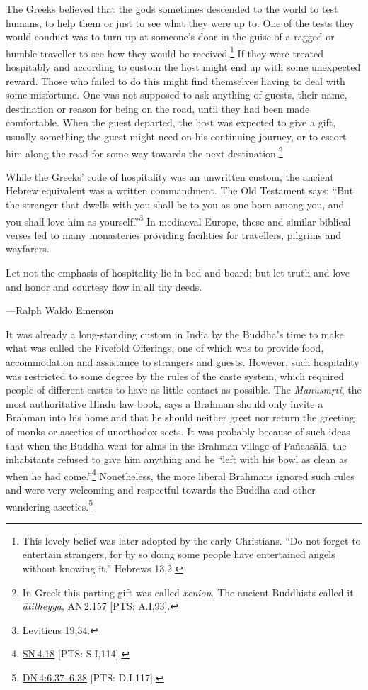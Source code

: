 \documentclass[10pt, openright]{book}
\newenvironment{epigram-2}%
{%
\vspace{1em}
\noindent
\quoting[leftmargin=2.5cm,rightmargin=2.5cm]%
\begin{itshape}
\large
}%
{\end{itshape}\endquoting
}%
\newenvironment{epigram-2-cite}%
{%
\quoting[leftmargin=2.5cm,rightmargin=2.5cm]%
\noindent\normal\hspace*{\fill} 
}%
{\endquoting\vspace{1em}
}%
\begin{document}
The Greeks believed that the gods sometimes descended to the world to test humans, to help them or just to see what they were up to. One of the tests they would conduct was to turn up at someone’s door in the guise of a ragged or humble traveller to see how they would be received.\footnote {This lovely belief was later adopted by the early Christians. “Do not forget to entertain strangers, for by so doing some people have entertained angels without knowing it.” Hebrews 13,2.} If they were treated hospitably and according to custom the host might end up with some unexpected reward. Those who failed to do this might find themselves having to deal with some misfortune. One was not supposed to ask anything of guests, their name, destination or reason for being on the road, until they had been made comfortable. When the guest departed, the host was expected to give a gift, usually something the guest might need on his continuing journey, or to escort him along the road for some way towards the next destination.\footnote {In Greek this parting gift was called \textit{xenion}. The ancient Buddhists called it \textit{ātitheyya}, \href{https://suttacentral.net/an2.157/en/sujato}{AN 2.157} [PTS: A.I,93].}


While the Greeks’ code of hospitality was an unwritten custom, the ancient Hebrew equivalent was a written commandment. The Old Testament says: “But the stranger that dwells with you shall be to you as one born among you, and you shall love him as yourself.”\footnote {Leviticus 19,34.} In mediaeval Europe, these and similar biblical verses led to many monasteries providing facilities for travellers, pilgrims and wayfarers.


\begin{epigram-2}
Let not the emphasis of hospitality lie in bed and board; but let truth and love and honor and courtesy flow in all thy deeds.
\end{epigram-2}

\begin{epigram-2-cite}
—Ralph Waldo Emerson
\end{epigram-2-cite}

It was already a long-standing custom in India by the Buddha’s time to make what was called the Fivefold Offerings, one of which was to provide food, accommodation and assistance to strangers and guests. However, such hospitality was restricted to some degree by the rules of the caste system, which required people of different castes to have as little contact as possible. The \textit{Manusmṛti}, the most authoritative Hindu law book, says a Brahman should only invite a Brahman into his home and that he should neither greet nor return the greeting of monks or ascetics of unorthodox sects. It was probably because of such ideas that when the Buddha went for alms in the Brahman village of Pañcasālā, the inhabitants refused to give him anything and he “left with his bowl as clean as when he had come.”\footnote {\href{https://suttacentral.net/sn4.18/en/sujato}{SN 4.18} [PTS: S.I,114].} Nonetheless, the more liberal Brahmans ignored such rules and were very welcoming and respectful towards the Buddha and other wandering ascetics.\footnote {\href{https://suttacentral.net/dn4/en/sujato\#6.37}{DN 4:6.37–6.38} [PTS: D.I,117].}
\end{document}
